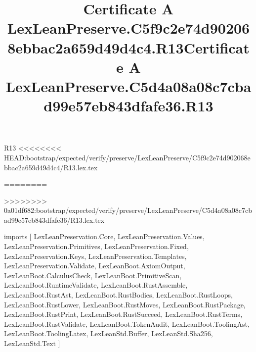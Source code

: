 \begin{lexlean}{R13}
<<<<<<<< HEAD:bootstrap/expected/verify/preserve/LexLeanPreserve/C5f9c2e74d902068ebbac2a659d49d4c4/R13.lex.tex
\title{Certificate A LexLeanPreserve.C5f9c2e74d902068ebbac2a659d49d4c4.R13}
========
\title{Certificate A LexLeanPreserve.C5d4a08a08c7cbad99e57eb843dfafe36.R13}
>>>>>>>> 0a01df682:bootstrap/expected/verify/preserve/LexLeanPreserve/C5d4a08a08c7cbad99e57eb843dfafe36/R13.lex.tex
\begin{coremodule}
imports [
  LexLeanPreservation.Core,
  LexLeanPreservation.Values,
  LexLeanPreservation.Primitives,
  LexLeanPreservation.Fixed,
  LexLeanPreservation.Keys,
  LexLeanPreservation.Templates,
  LexLeanPreservation.Validate,
  LexLeanBoot.AxiomOutput,
  LexLeanBoot.CalculusCheck,
  LexLeanBoot.PrimitiveScan,
  LexLeanBoot.RuntimeValidate,
  LexLeanBoot.RustAssemble,
  LexLeanBoot.RustAst,
  LexLeanBoot.RustBodies,
  LexLeanBoot.RustLoops,
  LexLeanBoot.RustLower,
  LexLeanBoot.RustMoves,
  LexLeanBoot.RustPackage,
  LexLeanBoot.RustPrint,
  LexLeanBoot.RustSucceed,
  LexLeanBoot.RustTerms,
  LexLeanBoot.RustValidate,
  LexLeanBoot.TokenAudit,
  LexLeanBoot.ToolingAst,
  LexLeanBoot.ToolingLatex,
  LexLeanStd.Buffer,
  LexLeanStd.Sha256,
  LexLeanStd.Text
]


\end{coremodule}
\end{lexlean}
